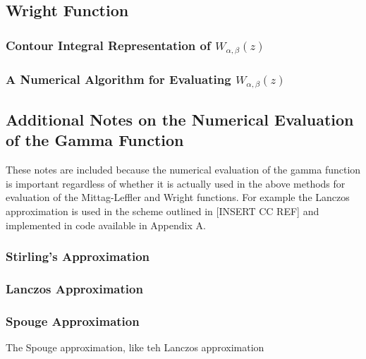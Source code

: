 \subsection{Wright Function}
\subsubsection{Contour Integral Representation of $ W_{\alpha, \beta}(z) $}
\subsubsection{A Numerical Algorithm for Evaluating $ W_{\alpha, \beta}(z) $}

\subsection{Additional Notes on the Numerical Evaluation of the Gamma Function}
\label{sec:num-gamma}
These notes are included because the numerical evaluation of the gamma function is important regardless of
whether it is actually used in the above methods for evaluation of the Mittag-Leffler and Wright functions.
For example the Lanczos approximation is used in the scheme outlined in [INSERT CC REF] and implemented 
in code available in Appendix A.

\subsubsection{Stirling's Approximation}

\subsubsection{Lanczos Approximation}

\subsubsection{Spouge Approximation}
The Spouge approximation, like teh Lanczos approximation 

\clearpage
